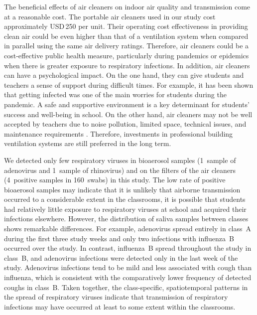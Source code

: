 \documentclass[fleqn,11pt]{wlscirep}
\begin{document}
The beneficial effects of air cleaners on indoor air quality and transmission come at a reasonable cost. The portable air cleaners used in our study cost approximately USD\,250 per unit. Their operating cost effectiveness in providing clean air could be even higher than that of a ventilation system when compared in parallel using the same air delivery ratings\cite{Noh2016EnBuild}. Therefore, air cleaners could be a cost-effective public health measure, particularly during pandemics or epidemics when there is greater exposure to respiratory infections. In addition, air cleaners can have a psychological impact. On the one hand, they can give students and teachers a sense of support during difficult times. For example, it has been shown that getting infected was one of the main worries for students during the pandemic\cite{Yuerekli2022IJERPH}. A safe and supportive environment is a key determinant for students' success and well-being in school\cite{Kutsyuruba2015RevEduc}. On the other hand, air cleaners may not be well accepted by teachers due to noise pollution, limited space, technical issues, and maintenance requirements \cite{Sanguinetti2022IndoorAir}. Therefore, investments in professional building ventilation systems are still preferred in the long term\cite{Nardell2016}.


We detected only few respiratory viruses in bioaerosol samples (1~sample of adenovirus and 1~sample of rhinovirus) and on the filters of the air cleaners (4~positive samples in 160~swabs) in this study. The low rate of positive bioaerosol samples may indicate that it is unlikely that airborne transmission occurred to a considerable extent in the classrooms, \ie it is possible that students had relatively little exposure to respiratory viruses at school and acquired their infections elsewhere. However, the distribution of saliva samples between classes shows remarkable differences. For example, adenovirus spread entirely in class~A during the first three study weeks and only two infections with influenza~B occurred over the study. In contrast, influenza~B spread throughout the study in class~B, and adenovirus infections were detected only in the last week of the study. Adenovirus infections tend to be mild\cite{Kunz2010CIDR} and less associated with cough than influenza\cite{Ma2018RMV}, which is consistent with the comparatively lower frequency of detected coughs in class~B. Taken together, the class-specific, spatiotemporal patterns in the spread of respiratory viruses indicate that transmission of respiratory infections may have occurred at least to some extent within the classrooms. 
\end{document}
